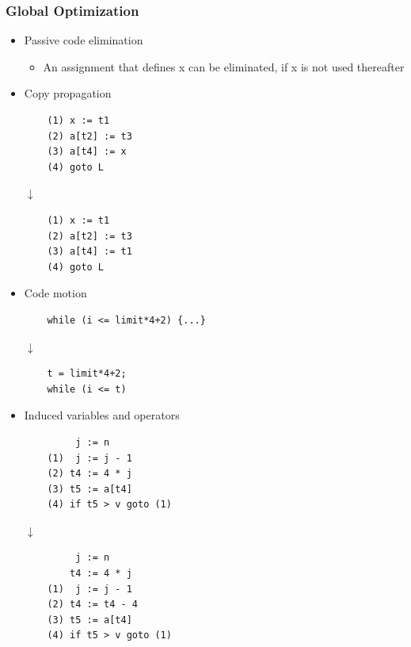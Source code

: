 \subsubsection{Global Optimization}
\begin{itemize}
	\item Passive code elimination
\begin{itemize}
	\item An assignment that defines x can be eliminated, if x is not used thereafter
\end{itemize}
	\item Copy propagation
\begin{verbatim}
	(1) x := t1
	(2) a[t2] := t3
	(3) a[t4] := x
	(4) goto L
\end{verbatim}
\begin{center}$\downarrow$\end{center}
\begin{verbatim}
	(1) x := t1
	(2) a[t2] := t3
	(3) a[t4] := t1
	(4) goto L
\end{verbatim}
	\item Code motion
\begin{verbatim}
	while (i <= limit*4+2) {...}
\end{verbatim}
\begin{center}$\downarrow$\end{center}
\begin{verbatim}
	t = limit*4+2;
	while (i <= t)
\end{verbatim}
	\item Induced variables and operators
\begin{verbatim}
	     j := n
	(1)  j := j - 1
	(2) t4 := 4 * j
	(3) t5 := a[t4]
	(4) if t5 > v goto (1)
\end{verbatim}
\begin{center}$\downarrow$\end{center}
\begin{verbatim}
	     j := n
	    t4 := 4 * j
	(1)  j := j - 1
	(2) t4 := t4 - 4
	(3) t5 := a[t4]
	(4) if t5 > v goto (1)	
\end{verbatim}
\end{itemize}






 









